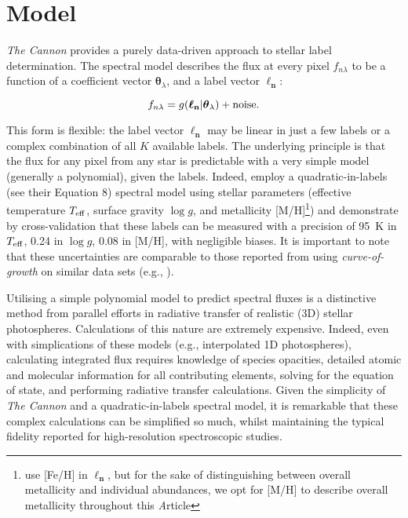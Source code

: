 \documentclass[useAMS,usenatbib]{mn2e}
\newcommand\article{\textit Article}
\newcommand\tc{\textit{The Cannon}}
\newcommand\lv{\mathbf{\boldsymbol\ell_n}}
\newcommand\cv{{\boldsymbol\theta}_\lambda}
\newcommand\given{|}
\begin{document}

\section{Model}


\tc{} provides a purely data-driven approach to stellar label determination. The
spectral model describes the flux at every pixel $f_{n\lambda}$ to be a function
of a coefficient vector $\cv$, and a label vector $\lv$:

\begin{equation}
    f_{n\lambda} = g(\lv\given\cv) + {\rm noise}.
\end{equation}

This form is flexible: the label vector $\lv$ may be linear in just a few labels
or a complex combination of all $K$ available labels. The underlying principle
is that the flux for any pixel from any star is predictable with a very simple
model (generally a polynomial), given the labels. Indeed, \citet{Ness2015}
employ a quadratic-in-labels (see their Equation 8) spectral model using stellar
parameters (effective temperature $T_{\rm eff}$, surface gravity $\log{g}$, and 
metallicity [M/H]\footnote{\citet{Ness2015} use [Fe/H] in $\lv$, but for the 
sake of distinguishing between overall metallicity and individual abundances,
we opt for [M/H] to describe overall metallicity throughout this \article{}})
and demonstrate by cross-validation that these labels can be 
measured with a precision of 95~K in $T_{\rm eff}$, 0.24 in $\log{g}$, 0.08 in 
[M/H], with negligible biases. It is important to note that these uncertainties
are comparable to those reported from using \textit{curve-of-growth} on similar 
data sets (e.g., \citet{X,Y}).  


Utilising a simple polynomial model to predict spectral fluxes is a distinctive
method from parallel efforts in radiative transfer of realistic (3D) stellar 
photospheres. Calculations of this nature are extremely expensive. Indeed, even
with simplications of these models (e.g., interpolated 1D photospheres),
calculating integrated flux requires knowledge of species opacities, detailed 
atomic and molecular information for all contributing elements, solving for
the equation of state, and performing radiative transfer calculations. Given the
simplicity of \tc{} and a quadratic-in-labels spectral model, it is remarkable
that these complex calculations can be simplified so much, whilst maintaining
the typical fidelity reported for high-resolution spectroscopic studies.
\end{document}
